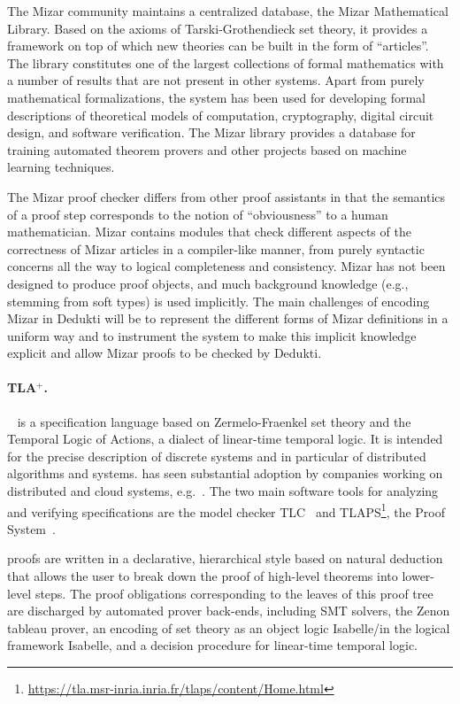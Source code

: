 The Mizar community maintains a centralized database, the Mizar Mathematical
Library. Based on the axioms of Tarski-Grothendieck set theory, it provides a
framework on top of which new theories can be built in the form of ``articles''.
The library constitutes one of the largest collections of formal mathematics with
a number of results that are not present in other systems. Apart from purely
mathematical formalizations, the system has been used for developing formal
descriptions of theoretical models of computation, cryptography, digital circuit
design, and software verification. The Mizar library provides a database for
training automated theorem provers and other projects based on machine learning
techniques.

The Mizar proof checker differs from other proof assistants in that the
semantics of a proof step corresponds to the notion of ``obviousness'' to a
human mathematician. Mizar contains modules that check different aspects of the
correctness of Mizar articles in a compiler-like manner, from purely syntactic
concerns all the way to logical completeness and consistency. Mizar has not been
designed to produce proof objects, and much background knowledge (e.g., stemming
from soft types) is used implicitly. The main challenges of encoding Mizar in
Dedukti will be to represent the different forms of Mizar definitions in a
uniform way and to instrument the system to make this implicit knowledge
explicit and allow Mizar proofs to be checked by Dedukti.

\paragraph*{TLA$^+$.}
\tlaplus~\cite{lamport:specifying} is a specification language based on
Zermelo-Fraenkel set theory and the Temporal Logic of Actions, a dialect of
linear-time temporal logic. It is intended for the precise description of
discrete systems and in particular of distributed algorithms and systems.
\tlaplus has seen substantial adoption by companies working on distributed and
cloud systems, e.g.~\cite{newcombe:amazon-cacm}. The two main software tools for
analyzing and verifying \tlaplus specifications are the model checker
TLC~\cite{yu:model-checking} and
TLAPS\footnote{\url{https://tla.msr-inria.inria.fr/tlaps/content/Home.html}},
the \tlaplus Proof System~\cite{cousineau:tla-proofs}.

\tlaplus proofs are written in a declarative, hierarchical style based on
natural deduction that allows the user to break down the proof of high-level
theorems into lower-level steps. The proof obligations corresponding to the
leaves of this proof tree are discharged by automated prover back-ends,
including SMT solvers, the Zenon tableau prover, an encoding of \tlaplus set
theory as an object logic Isabelle/\tlaplus in the logical framework Isabelle,
and a decision procedure for linear-time temporal logic.

